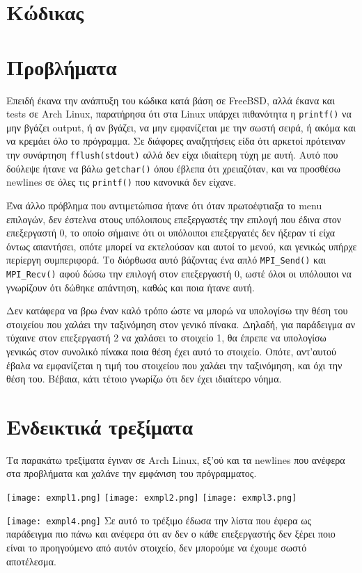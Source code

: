 \documentclass{article}
\begin{document}
\section{Κώδικας}


\section{Προβλήματα}
Επειδή έκανα την ανάπτυξη του κώδικα κατά βάση σε FreeBSD, αλλά έκανα και tests
σε Arch Linux, παρατήρησα ότι στα Linux υπάρχει πιθανότητα η \lstinline{printf()}
να μην βγάζει output, ή αν βγάζει, να μην εμφανίζεται με την σωστή σειρά, ή ακόμα
και να κρεμάει όλο το πρόγραμμα. Σε διάφορες αναζητήσεις είδα ότι αρκετοί πρότειναν
την συνάρτηση \lstinline{fflush(stdout)} αλλά δεν είχα ιδιαίτερη τύχη με αυτή.
Αυτό που δούλεψε ήτανε να βάλω \lstinline{getchar()} όπου έβλεπα ότι χρειαζόταν,
και να προσθέσω newlines σε όλες τις \lstinline{printf()} που κανονικά δεν είχανε.

Ένα άλλο πρόβλημα που αντιμετώπισα ήτανε ότι όταν πρωτοέφτιαξα το menu επιλογών, δεν
έστελνα στους υπόλοιπους επεξεργαστές την επιλογή που έδινα στον επεξεργαστή 0,
το οποίο σήμαινε ότι οι υπόλοιποι επεξεργατές δεν ήξεραν τί είχα όντως απαντήσει,
οπότε μπορεί να εκτελούσαν και αυτοί το μενού, και γενικώς υπήρχε περίεργη
συμπεριφορά. Το διόρθωσα αυτό βάζοντας ένα απλό \lstinline{MPI_Send()} και
\lstinline{MPI_Recv()} αφού δώσω την επιλογή στον επεξεργαστή 0, ωστέ όλοι οι
υπόλοιποι να γνωρίζουν ότι δώθηκε απάντηση, καθώς και ποια ήτανε αυτή.

Δεν κατάφερα να βρω έναν καλό τρόπο ώστε να μπορώ να υπολογίσω την θέση του
στοιχείου που χαλάει την ταξινόμηση στον γενικό πίνακα. Δηλαδή, για παράδειγμα
αν τύχαινε στον επεξεργαστή 2 να χαλάσει το στοιχείο 1, θα έπρεπε να υπολογίσω
γενικώς στον συνολικό πίνακα ποια θέση έχει αυτό το στοιχείο. Οπότε, αντ'αυτού
έβαλα να εμφανίζεται η τιμή του στοιχείου που χαλάει την ταξινόμηση, και όχι την
θέση του. Βέβαια, κάτι τέτοιο γνωρίζω ότι δεν έχει ιδιαίτερο νόημα.

\section{Ενδεικτικά τρεξίματα}
Τα παρακάτω τρεξίματα έγιναν σε Arch Linux, εξ'ού και τα newlines που ανέφερα
στα προβλήματα και χαλάνε την εμφάνιση του πρόγραμματος.

\texttt{[image: exmpl1.png]}
\texttt{[image: exmpl2.png]}
\texttt{[image: exmpl3.png]}

\texttt{[image: exmpl4.png]}
Σε αυτό το τρέξιμο έδωσα την λίστα που έφερα ως παράδειγμα πιο πάνω
και ανέφερα ότι αν δεν ο κάθε επεξεργαστής δεν ξέρει ποιο είναι το προηγούμενο από
αυτόν στοιχείο, δεν μπορούμε να έχουμε σωστό αποτέλεσμα.
\end{document}
